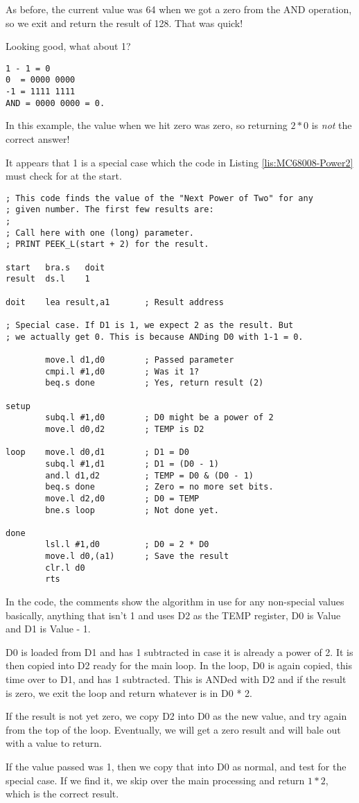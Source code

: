 As before, the current value was 64 when we got a zero from the AND
operation, so we exit and return the result of 128. That was quick!

Looking good, what about 1?

\begin{lstlisting}[showstringspaces=false,tabsize=4]
1 - 1 = 0
0  = 0000 0000
-1 = 1111 1111
AND = 0000 0000 = 0.
\end{lstlisting}

In this example, the value when we hit zero was zero, so returning
$2*0$ is \emph{not} the correct answer!

It appears that 1 is a special case which the code in Listing \ref{lis:MC68008-Power2}
must check for at the start.

\begin{lstlisting}[caption={MC68008 - Power2\_asm},label={lis:MC68008-Power2}]
; This code finds the value of the "Next Power of Two" for any
; given number. The first few results are:
;
; Call here with one (long) parameter.
; PRINT PEEK_L(start + 2) for the result.

start   bra.s   doit
result  ds.l    1

doit    lea result,a1       ; Result address

; Special case. If D1 is 1, we expect 2 as the result. But
; we actually get 0. This is because ANDing D0 with 1-1 = 0.

        move.l d1,d0        ; Passed parameter
        cmpi.l #1,d0        ; Was it 1?
        beq.s done          ; Yes, return result (2)

setup
        subq.l #1,d0        ; D0 might be a power of 2
        move.l d0,d2        ; TEMP is D2

loop    move.l d0,d1        ; D1 = D0
        subq.l #1,d1        ; D1 = (D0 - 1)
        and.l d1,d2         ; TEMP = D0 & (D0 - 1)
        beq.s done          ; Zero = no more set bits.
        move.l d2,d0        ; D0 = TEMP
        bne.s loop          ; Not done yet.

done
        lsl.l #1,d0         ; D0 = 2 * D0
        move.l d0,(a1)      ; Save the result
        clr.l d0
        rts

\end{lstlisting}

In the code, the comments show the algorithm in use for any non-special
values \textendash{} basically, anything that isn't 1 \textendash{}
and uses D2 as the TEMP register, D0 is Value and D1 is Value - 1.

D0 is loaded from D1 and has 1 subtracted in case it is already a
power of 2. It is then copied into D2 ready for the main loop. In
the loop, D0 is again copied, this time over to D1, and has 1 subtracted.
This is ANDed with D2 and if the result is zero, we exit the loop
and return whatever is in D0 {*} 2.

If the result is not yet zero, we copy D2 into D0 as the new value,
and try again from the top of the loop. Eventually, we will get a
zero result and will bale out with a value to return.

If the value passed was 1, then we copy that into D0 as normal, and
test for the special case. If we find it, we skip over the main processing
and return $1*2$, which is the correct result.
